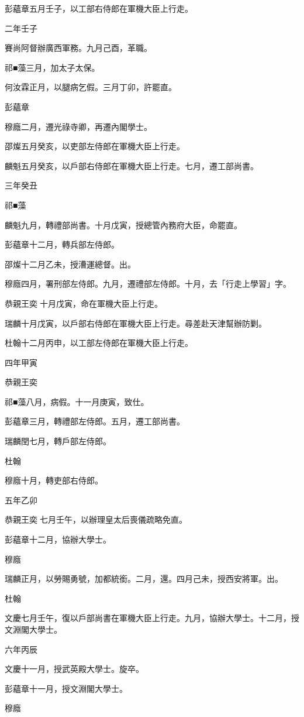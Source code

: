 \begin{pinyinscope}
彭蘊章五月壬子，以工部右侍郎在軍機大臣上行走。

二年壬子

賽尚阿督辦廣西軍務。九月己酉，革職。

祁■藻三月，加太子太保。

何汝霖正月，以腿病乞假。三月丁卯，許罷直。

彭蘊章

穆廕二月，遷光祿寺卿，再遷內閣學士。

邵燦五月癸亥，以吏部左侍郎在軍機大臣上行走。

麟魁五月癸亥，以戶部右侍郎在軍機大臣上行走。七月，遷工部尚書。

三年癸丑

祁■藻

麟魁九月，轉禮部尚書。十月戊寅，授總管內務府大臣，命罷直。

彭蘊章十二月，轉兵部左侍郎。

邵燦十二月乙未，授漕運總督。出。

穆廕四月，署刑部左侍郎。九月，遷禮部左侍郎。十月，去「行走上學習」字。

恭親王奕十月戊寅，命在軍機大臣上行走。

瑞麟十月戊寅，以戶部右侍郎在軍機大臣上行走。尋差赴天津幫辦防剿。

杜翰十二月丙申，以工部左侍郎在軍機大臣上行走。

四年甲寅

恭親王奕

祁■藻八月，病假。十一月庚寅，致仕。

彭蘊章三月，轉禮部左侍郎。五月，遷工部尚書。

瑞麟閏七月，轉戶部左侍郎。

杜翰

穆廕十月，轉吏部右侍郎。

五年乙卯

恭親王奕七月壬午，以辦理皇太后喪儀疏略免直。

彭蘊章十二月，協辦大學士。

穆廕

瑞麟正月，以勞賜勇號，加都統銜。二月，還。四月己未，授西安將軍。出。

杜翰

文慶七月壬午，復以戶部尚書在軍機大臣上行走。九月，協辦大學士。十二月，授文淵閣大學士。

六年丙辰

文慶十一月，授武英殿大學士。旋卒。

彭蘊章十一月，授文淵閣大學士。

穆廕


\end{pinyinscope}
